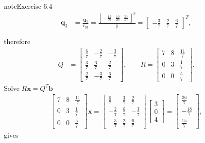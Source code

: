 \documentclass[letterpaper,10pt,english]{jupyterBook}
\begin{document}
\begin{sphinxadmonition}{note}{Exercise 6.4}
\begin{align*}
    \mathbf{q}_{3} &= \frac{\mathbf{u}_{3}}{r_{33}} = \frac{\left[\begin{matrix}- \frac{15}{49} & \frac{10}{49} & \frac{30}{49}\end{matrix}\right]^T}{\frac{5}{7}} = \left[\begin{matrix}- \frac{3}{7} & \frac{2}{7} & \frac{6}{7}\end{matrix}\right]^T, \\
     \\
\end{align*}
\sphinxAtStartPar
therefore
\begin{align*}
    Q &= \left[\begin{matrix}\frac{6}{7} & - \frac{2}{7} & - \frac{3}{7}\\\frac{3}{7} & \frac{6}{7} & \frac{2}{7}\\\frac{2}{7} & - \frac{3}{7} & \frac{6}{7}\end{matrix}\right], \qquad R = \left[\begin{matrix}7 & 8 & \frac{11}{7}\\0 & 3 & \frac{1}{7}\\0 & 0 & \frac{5}{7}\end{matrix}\right].
\end{align*}
\sphinxAtStartPar
Solve \(R \mathbf{{x}} = Q^T \mathbf{{b}}\)
\begin{align*}
    \left[\begin{matrix}7 & 8 & \frac{11}{7}\\0 & 3 & \frac{1}{7}\\0 & 0 & \frac{5}{7}\end{matrix}\right] \mathbf{x} = \left[\begin{matrix}\frac{6}{7} & \frac{3}{7} & \frac{2}{7}\\- \frac{2}{7} & \frac{6}{7} & - \frac{3}{7}\\- \frac{3}{7} & \frac{2}{7} & \frac{6}{7}\end{matrix}\right]\left[\begin{matrix}3\\0\\4\end{matrix}\right] = \left[\begin{matrix}\frac{26}{7}\\- \frac{18}{7}\\\frac{15}{7}\end{matrix}\right],
\end{align*}
\sphinxAtStartPar
gives
\begin{align*}

\end{align*}
\end{sphinxadmonition}
\end{document}
